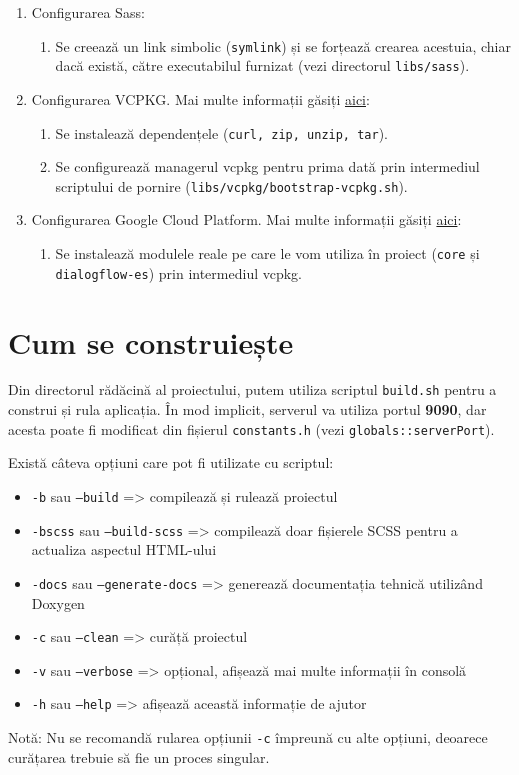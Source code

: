 \begin{enumerate}
  \item Configurarea Sass:
    \begin{enumerate}
      \item Se creează un link simbolic (\texttt{symlink}) și se forțează crearea acestuia, chiar dacă există, către executabilul furnizat (vezi directorul \texttt{libs/sass}).
    \end{enumerate}
  \item Configurarea VCPKG. Mai multe informații găsiți \href{https://github.com/Microsoft/vcpkg}{aici}:
    \begin{enumerate}
      \item Se instalează dependențele (\texttt{curl, zip, unzip, tar}).
      \item Se configurează managerul vcpkg pentru prima dată prin intermediul scriptului de pornire (\texttt{libs/vcpkg/bootstrap-vcpkg.sh}).
    \end{enumerate}
  \item Configurarea Google Cloud Platform. Mai multe informații găsiți \href{https://github.com/googleapis/google-cloud-cpp/tree/main/google/cloud/dialogflow_es/quickstart}{aici}:
    \begin{enumerate}
      \item Se instalează modulele reale pe care le vom utiliza în proiect (\texttt{core} și \texttt{dialogflow-es}) prin intermediul vcpkg.
    \end{enumerate}
\end{enumerate}

\section{Cum se construiește}
Din directorul rădăcină al proiectului, putem utiliza scriptul \texttt{build.sh} pentru a construi și rula aplicația. În mod implicit, serverul va utiliza portul \textbf{9090}, dar acesta poate fi modificat din fișierul \texttt{constants.h} (vezi \texttt{globals::serverPort}).

Există câteva opțiuni care pot fi utilizate cu scriptul:
\begin{itemize}
  \item \texttt{-b} sau \texttt{--build} => compilează și rulează proiectul
  \item \texttt{-bscss} sau \texttt{--build-scss} => compilează doar fișierele SCSS pentru a actualiza aspectul HTML-ului
  \item \texttt{-docs} sau \texttt{--generate-docs} => generează documentația tehnică utilizând Doxygen
  \item \texttt{-c} sau \texttt{--clean} => curăță proiectul
  \item \texttt{-v} sau \texttt{--verbose} => opțional, afișează mai multe informații în consolă
  \item \texttt{-h} sau \texttt{--help} => afișează această informație de ajutor
\end{itemize}

Notă: Nu se recomandă rularea opțiunii \texttt{-c} împreună cu alte opțiuni, deoarece curățarea trebuie să fie un proces singular.